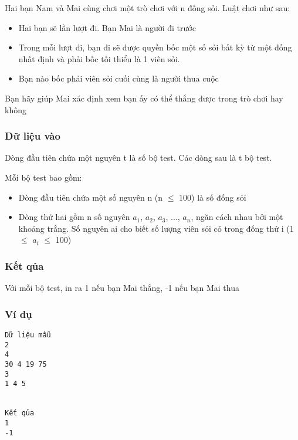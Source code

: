 

Hai bạn Nam và Mai cùng chơi một trò chơi với n đống sỏi. Luật chơi như sau:
\begin{itemize}
	\item Hai bạn sẽ lần lượt đi. Bạn Mai là người đi trước
	\item Trong mỗi lượt đi, bạn đi sẽ được quyền bốc một số sỏi bất kỳ từ một đống nhất định và phải bốc tối thiểu là 1 viên sỏi.
	\item Bạn nào bốc phải viên sỏi cuối cùng là người thua cuộc
\end{itemize}

Bạn hãy giúp Mai xác định xem bạn ấy có thể thắng được trong trò chơi hay không

\subsubsection{Dữ liệu vào}

Dòng đầu tiên chứa một nguyên t là số bộ test. Các dòng sau là t bộ test.

Mỗi bộ test bao gồm:
\begin{itemize}
	\item Dòng đầu tiên chứa một số nguyên n (n  $\le$  100) là số đống sỏi
	\item Dòng thứ hai gồm n số nguyên $a_{1}$, $a_{2}$, $a_{3}$, ..., $a_{n}$, ngăn cách nhau bởi một khoảng trắng. Số nguyên ai cho biết số lượng viên sỏi có trong đống thứ i (1  $\le$  $a_{i}$  $\le$  100)
\end{itemize}

\subsubsection{Kết qủa}

Với mỗi bộ test, in ra 1 nếu bạn Mai thắng, -1 nếu bạn Mai thua

\subsubsection{Ví dụ}
\begin{verbatim}
Dữ liệu mẫu
2
4
30 4 19 75
3
1 4 5


Kết qủa
1
-1
\end{verbatim}
